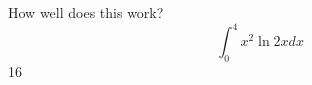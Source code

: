 \documentclass{article}
\begin{document}
How well does this work?
$$\int_0^4 x^2 \ln{2x}dx$$
16
\end{document}
